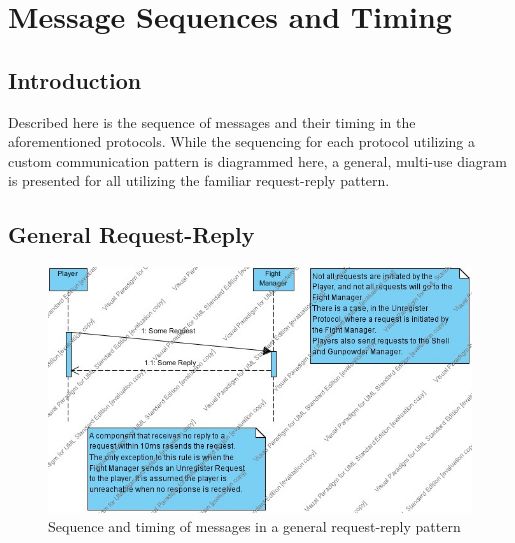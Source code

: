 \documentclass[12pt]{article}
\begin{document}
\section{Message Sequences and Timing}
	\subsection{Introduction}
		Described here is the sequence of messages and their timing in the aforementioned protocols. While the sequencing for each protocol utilizing a custom communication pattern is diagrammed here, a general, multi-use diagram is presented for all utilizing the familiar request-reply pattern.
	\newpage
	\subsection{General Request-Reply}
		\begin{center}
			\begin{figure}[htp]
				\centering
				\includegraphics[width=\textwidth]{Diagrams/Sequence Diagrams/General.jpg}
				\caption{Sequence and timing of messages in a general request-reply pattern}
			\end{figure}
		\end{center}
	\newpage
\end{document}
